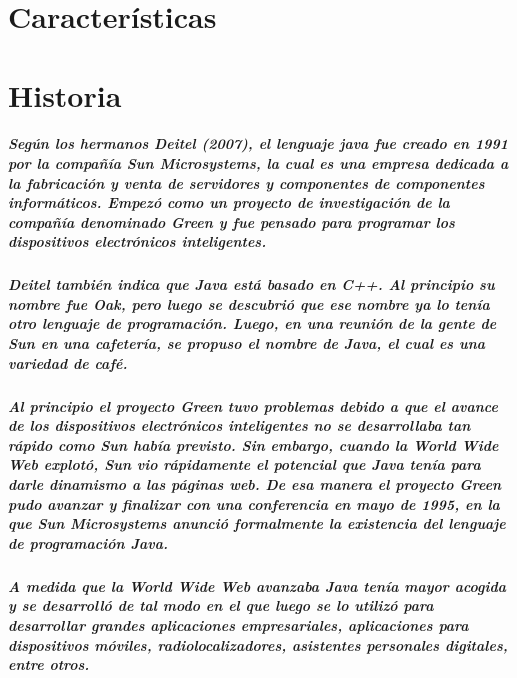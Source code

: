 \documentclass[12pt]{book} %
\begin{document}
\paragraph{}

\chapter{Características}
\chapter{Historia}
\paragraph{Según los hermanos Deitel (2007), el lenguaje java fue creado en 1991 por la compañía Sun Microsystems, la cual es una empresa dedicada a la fabricación y venta de servidores y componentes de componentes informáticos. Empezó como un proyecto de investigación de la compañía denominado Green y fue pensado para programar los dispositivos electrónicos inteligentes.}
\paragraph{Deitel también indica que Java está basado en C++. Al principio su nombre fue Oak, pero luego se descubrió que ese nombre ya lo tenía otro lenguaje de programación. Luego, en una reunión de la gente de Sun en una cafetería, se propuso el nombre de Java, el cual es una variedad de café. }
\paragraph{Al principio el proyecto Green tuvo problemas debido a que el avance de los dispositivos electrónicos inteligentes no se desarrollaba tan rápido como Sun había previsto. Sin embargo, cuando la World Wide Web explotó, Sun vio rápidamente el potencial que Java tenía para darle dinamismo a las páginas web. De esa manera el proyecto Green pudo avanzar y finalizar con una conferencia en mayo de 1995, en la que Sun Microsystems anunció formalmente la existencia del lenguaje de programación Java. }
\paragraph{A medida que la World Wide Web avanzaba Java tenía mayor acogida y se desarrolló de tal modo en el que luego se lo utilizó para desarrollar grandes aplicaciones empresariales, aplicaciones para dispositivos móviles, radiolocalizadores, asistentes personales digitales, entre otros. }
\end{document}
